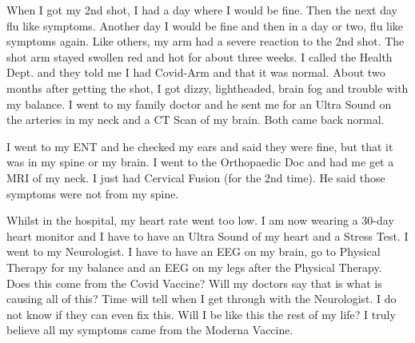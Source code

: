 When I got my 2nd shot, I had a day where I would be fine. Then the next day flu
like symptoms. Another day I would be fine and then in a day or two, flu like
symptoms again. Like others, my arm had a severe reaction to the 2nd shot. The
shot arm stayed swollen red and hot for about three weeks. I called the Health
Dept. and they told me I had Covid-Arm and that it was normal. About two months
after getting the shot, I got dizzy, lightheaded, brain fog and trouble with my
balance. I went to my family doctor and he sent me for an Ultra Sound on the
arteries in my neck and a CT Scan of my brain. Both came back normal.

I went to my ENT and he checked my ears and said they were fine, but that it was
in my spine or my brain. I went to the Orthopaedic Doc and had me get a MRI of
my neck. I just had Cervical Fusion (for the 2nd time). He said those symptoms
were not from my spine.

Whilst in the hospital, my heart rate went too low. I am now wearing a 30-day
heart monitor and I have to have an Ultra Sound of my heart and a Stress Test. I
went to my Neurologist. I have to have an EEG on my brain, go to Physical
Therapy for my balance and an EEG on my legs after the Physical Therapy. Does
this come from the Covid Vaccine? Will my doctors say that is what is causing
all of this? Time will tell when I get through with the Neurologist. I do not
know if they can even fix this. Will I be like this the rest of my life? I truly
believe all my symptoms came from the Moderna Vaccine.

